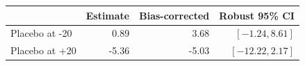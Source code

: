 \begin{center}
\small\renewcommand{\arraystretch}{1.3}
\begin{tabular}{@{}lrrr@{}}\toprule
 & Estimate & Bias-corrected & Robust 95\% CI\\\midrule
Placebo at -20 & 0.89 & 3.68 & $[-1.24, 8.61]$\\
Placebo at +20 & -5.36 & -5.03 & $[-12.22, 2.17]$\\
\bottomrule\end{tabular}
\end{center}
